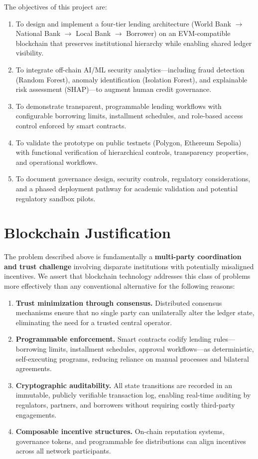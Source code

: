 \documentclass[12pt,a4paper]{report}
\begin{document}
The objectives of this project are:

\begin{enumerate}[noitemsep]
\item To design and implement a four-tier lending architecture (World Bank $\to$ National Bank $\to$ Local Bank $\to$ Borrower) on an EVM-compatible blockchain that preserves institutional hierarchy while enabling shared ledger visibility.
\item To integrate off-chain AI/ML security analytics---including fraud detection (Random Forest), anomaly identification (Isolation Forest), and explainable risk assessment (SHAP)---to augment human credit governance.
\item To demonstrate transparent, programmable lending workflows with configurable borrowing limits, installment schedules, and role-based access control enforced by smart contracts.
\item To validate the prototype on public testnets (Polygon, Ethereum Sepolia) with functional verification of hierarchical controls, transparency properties, and operational workflows.
\item To document governance design, security controls, regulatory considerations, and a phased deployment pathway for academic validation and potential regulatory sandbox pilots.
\end{enumerate}

\section{Blockchain Justification}

The problem described above is fundamentally a \textbf{multi-party coordination and trust challenge} involving disparate institutions with potentially misaligned incentives. We assert that blockchain technology addresses this class of problems more effectively than any conventional alternative for the following reasons:

\begin{enumerate}[noitemsep]
\item \textbf{Trust minimization through consensus.} Distributed consensus mechanisms ensure that no single party can unilaterally alter the ledger state, eliminating the need for a trusted central operator.

\item \textbf{Programmable enforcement.} Smart contracts codify lending rules---borrowing limits, installment schedules, approval workflows---as deterministic, self-executing programs, reducing reliance on manual processes and bilateral agreements.

\item \textbf{Cryptographic auditability.} All state transitions are recorded in an immutable, publicly verifiable transaction log, enabling real-time auditing by regulators, partners, and borrowers without requiring costly third-party engagements.

\item \textbf{Composable incentive structures.} On-chain reputation systems, governance tokens, and programmable fee distributions can align incentives across all network participants.
\end{enumerate}
\end{document}
